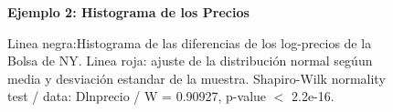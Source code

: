 \begin{figure}[h]
	\centering
	\textbf{Ejemplo 2: Histograma de los Precios}\par\medskip
	\caption{Linea negra:Histograma de las diferencias de los log-precios de la Bolsa de NY. Linea roja: ajuste de la distribución normal segúun media y desviación estandar de la muestra. Shapiro-Wilk normality test / data:  Dlnprecio / W = 0.90927, p-value $<$ 2.2e-16.}\label{figura5}
\end{figure}

